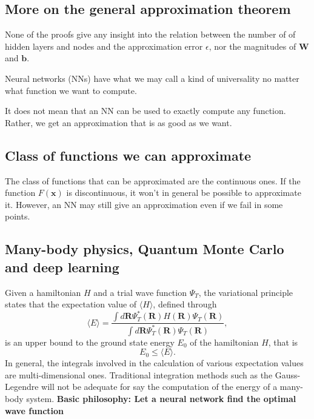 \documentclass[%
oneside,                 %
final,                   %
10pt]{article}
\begin{document}
\subsection{More on the general approximation theorem}

None of the proofs give any insight into the relation between the
number of of hidden layers and nodes and the approximation error
$\epsilon$, nor the magnitudes of $\bm{W}$ and $\bm{b}$.

Neural networks (NNs) have what we may call a kind of universality no matter what function we want to compute.

\begin{block}{}
It does not mean that an NN can be used to exactly compute any function. Rather, we get an approximation that is as good as we want. 
\end{block}

\subsection{Class of functions we can approximate}

\begin{block}{}
The class of functions that can be approximated are the continuous ones.
If the function $F(\bm{x})$ is discontinuous, it won't in general be possible to approximate it. However, an NN may still give an approximation even if we fail in some points.
\end{block}

\subsection{Many-body physics, Quantum Monte Carlo and deep learning}
\begin{block}{}
Given a hamiltonian $H$ and a trial wave function $\Psi_T$, the variational principle states that the expectation value of $\langle H \rangle$, defined through 
\[
   \langle E \rangle =
   \frac{\int d\bm{R}\Psi^{\ast}_T(\bm{R})H(\bm{R})\Psi_T(\bm{R})}
        {\int d\bm{R}\Psi^{\ast}_T(\bm{R})\Psi_T(\bm{R})},
\]
is an upper bound to the ground state energy $E_0$ of the hamiltonian $H$, that is 
\[
    E_0 \le \langle E \rangle.
\]
In general, the integrals involved in the calculation of various  expectation values  are multi-dimensional ones. Traditional integration methods such as the Gauss-Legendre will not be adequate for say the  computation of the energy of a many-body system.  \textbf{Basic philosophy: Let a neural network find the optimal wave function}
\end{block}
\end{document}
